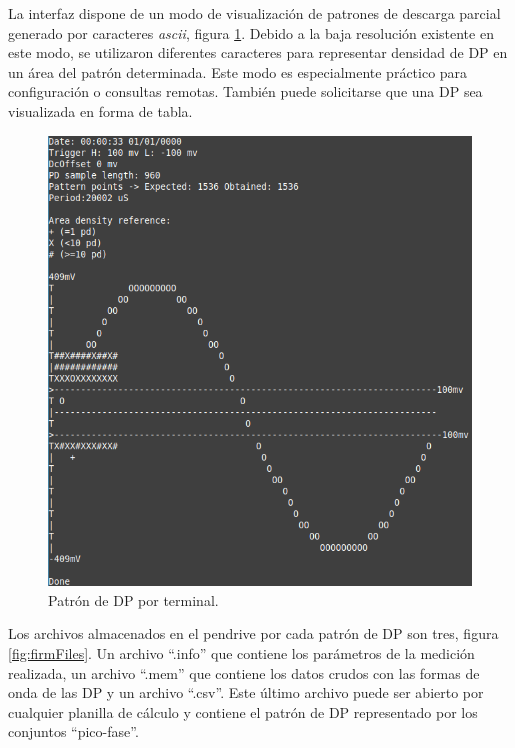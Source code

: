 \vspace{5mm}

La interfaz dispone de un modo de visualización de patrones de descarga parcial generado por caracteres \textit{ascii}, figura \ref{fig:firmInterfaz}. Debido a la baja resolución existente en este modo, se utilizaron diferentes caracteres para representar densidad de DP en un área del patrón determinada. Este modo es especialmente práctico para configuración o consultas remotas. También puede solicitarse que una DP sea visualizada en forma de tabla.

\vspace{5mm}

\begin{figure}[ht]
	\centering
	\includegraphics[width=130mm]{./Figures/firmInterfaz.png}
	\caption{Patrón de DP por terminal.}
	\label{fig:firmInterfaz}
\end{figure}

Los archivos almacenados en el pendrive por cada patrón de DP son tres, figura \ref{fig:firmFiles}. Un archivo \enquote{.info} que contiene los parámetros de la medición realizada, un archivo \enquote{.mem} que contiene los datos crudos con las formas de onda de las DP y un archivo \enquote{.csv}. Este último archivo puede ser abierto por cualquier planilla de cálculo y contiene el patrón de DP representado por los conjuntos \enquote{pico-fase}.

